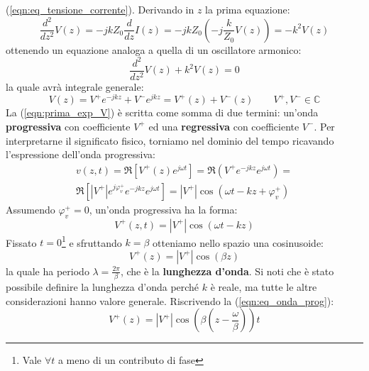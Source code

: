 \documentclass{book}
\begin{document}
        (\ref{eqn:eq_tensione_corrente}). Derivando in $z$ la prima equazione:
        \begin{equation}
            \frac{d^{2}}{dz^{2}}V(z)=-jkZ_{0}\frac{d}{dz}I(z)=-jkZ_{0}(-j\frac{k}{Z_{0}}V(z))= -k^{2}V(z)
        \end{equation}
        ottenendo un equazione analoga a quella di un oscillatore armonico:
        \begin{equation}
            \frac{d^{2}}{dz^{2}}V(z)+k^{2}V(z)=0
        \end{equation}
        la quale avrà integrale generale:
        \begin{equation}
            \label{eqn:prima_exp_V}
            V(z)=V^{+}e^{-j k z}+V^{-}e^{jkz}=V^{+}(z)+V^{-}(z) \qquad V^{+},V^{-} \in \mathbb{C}
        \end{equation}
        La (\ref{eqn:prima_exp_V}) è scritta come somma di due termini: un'onda \textbf{progressiva} con coefficiente
        $V^{+}$ ed una \textbf{regressiva} con coefficiente $V^{-}$. Per interpretarne il significato fisico, torniamo nel dominio 
        del tempo ricavando l'espressione dell'onda progressiva:
        \begin{align}
            v(z, t)= \Re[V^{+}(z)e^{j \omega t}] = \Re(V^{+}e^{-jkz}e^{j \omega t}) =
            \\ \Re[|V^{+}|e^{j \varphi_{v} ^{+}}e^{-j k z}e^{j \omega t}] = |V^{+}|\cos(\omega t-kz+\varphi^{+}_{v})
        \end{align}
        Assumendo $\varphi^{+}_{v} = 0$, un'onda progressiva ha la forma:
        \begin{equation}
            \label{eqn:eq_onda_prog}
            V^{+}(z, t) = |V^{+}|\cos(\omega t-kz)
        \end{equation}
        Fissato $t=0$\footnote{Vale $\forall t$ a meno di un contributo di fase} e sfruttando $k=\beta$ otteniamo nello spazio una cosinusoide:
        \begin{equation}
            V^{+}(z)=|V^{+}|\cos(\beta z)
        \end{equation}
        la quale ha periodo $\displaystyle \lambda = \frac{2 \pi}{\beta}$, che è la \textbf{lunghezza d'onda}. Si noti che
        è stato possibile definire la lunghezza d'onda perché $k$ è reale, ma tutte le altre considerazioni hanno valore generale.
        \newpage
        Riscrivendo la (\ref{eqn:eq_onda_prog}):
        \begin{equation}
            V^{+}(z)=|V^{+}|\cos{(\beta (z - \frac{\omega}{\beta}))t}
        \end{equation}
\end{document}
